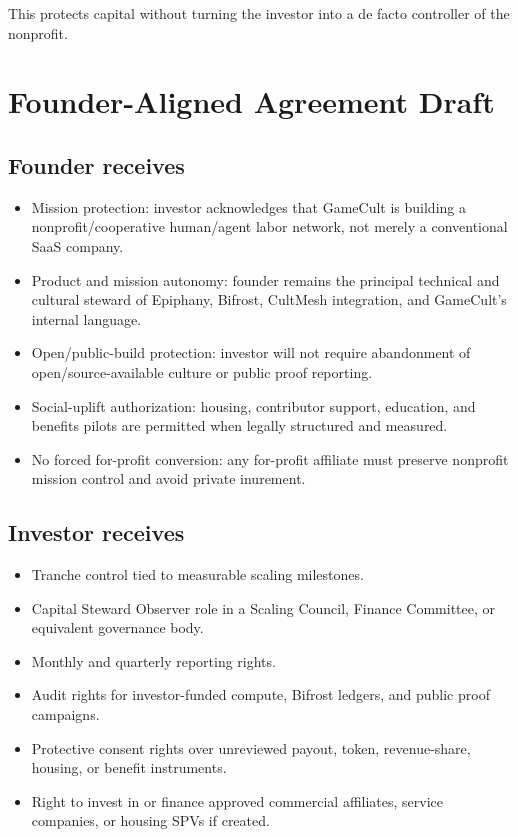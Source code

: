 \documentclass[11pt,oneside]{report}
\begin{document}
This protects capital without turning the investor into a de facto controller of the nonprofit.

\chapter{Founder-Aligned Agreement Draft}

\section{Founder receives}

\begin{itemize}
  \item Mission protection: investor acknowledges that GameCult is building a nonprofit/cooperative human/agent labor network, not merely a conventional SaaS company.
  \item Product and mission autonomy: founder remains the principal technical and cultural steward of Epiphany, Bifrost, CultMesh integration, and GameCult's internal language.
  \item Open/public-build protection: investor will not require abandonment of open/source-available culture or public proof reporting.
  \item Social-uplift authorization: housing, contributor support, education, and benefits pilots are permitted when legally structured and measured.
  \item No forced for-profit conversion: any for-profit affiliate must preserve nonprofit mission control and avoid private inurement.
\end{itemize}

\section{Investor receives}

\begin{itemize}
  \item Tranche control tied to measurable scaling milestones.
  \item Capital Steward Observer role in a Scaling Council, Finance Committee, or equivalent governance body.
  \item Monthly and quarterly reporting rights.
  \item Audit rights for investor-funded compute, Bifrost ledgers, and public proof campaigns.
  \item Protective consent rights over unreviewed payout, token, revenue-share, housing, or benefit instruments.
  \item Right to invest in or finance approved commercial affiliates, service companies, or housing SPVs if created.
\end{itemize}
\end{document}
